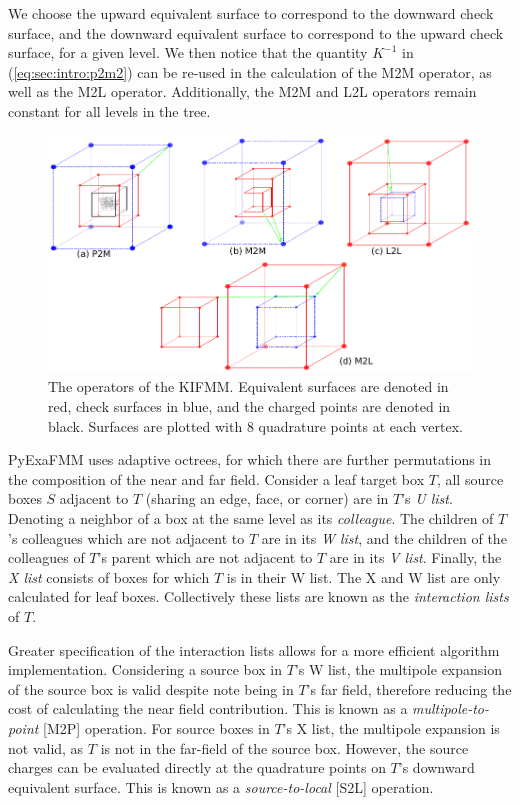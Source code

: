 \documentclass{IEEEcsmag}
\begin{document}
We choose the upward equivalent surface to correspond to the downward check surface, and the downward equivalent surface to correspond to the upward check surface, for a given level. We then notice that the quantity $K^{-1}$ in (\ref{eq:sec:intro:p2m2}) can be re-used in the calculation of the M2M operator, as well as the M2L operator. Additionally, the M2M and L2L operators remain constant for all levels in the tree.

\begin{figure}
	\centerline{\includegraphics {figures/operators.pdf}}
	\caption{The operators of the KIFMM. Equivalent surfaces are denoted in red, check surfaces in blue, and the charged points are denoted in black. Surfaces are plotted with 8 quadrature points at each vertex.}
	\label{fig:operators}
\end{figure}

PyExaFMM uses adaptive octrees, for which there are further permutations in the composition of the near and far field. Consider a leaf target box $T$, all source boxes $S$ adjacent to $T$ (sharing an edge, face, or corner) are in $T$'s \textit{U list}. Denoting a neighbor of a box at the same level as its \textit{colleague}. The children of $T$'s colleagues which are not adjacent to $T$ are in its \textit{W list}, and the children of the colleagues of $T$'s parent which are not adjacent to $T$ are in its \textit{V list}. Finally, the \textit{X list} consists of boxes for which $T$ is in their W list. The X and W list are only calculated for leaf boxes. Collectively these lists are known as the \textit{interaction lists} of $T$.

Greater specification of the interaction lists allows for a more efficient algorithm implementation. Considering a source box in $T$'s W list, the multipole expansion of the source box is valid despite note being in $T$'s far field, therefore reducing the cost of calculating the near field contribution. This is known as a \textit{multipole-to-point} [M2P] operation. For source boxes in $T$'s X list, the multipole expansion is not valid, as $T$ is not in the far-field of the source box. However, the source charges can be evaluated directly at the quadrature points on $T$'s downward equivalent surface. This is known as a \textit{source-to-local} [S2L] operation.
\end{document}
